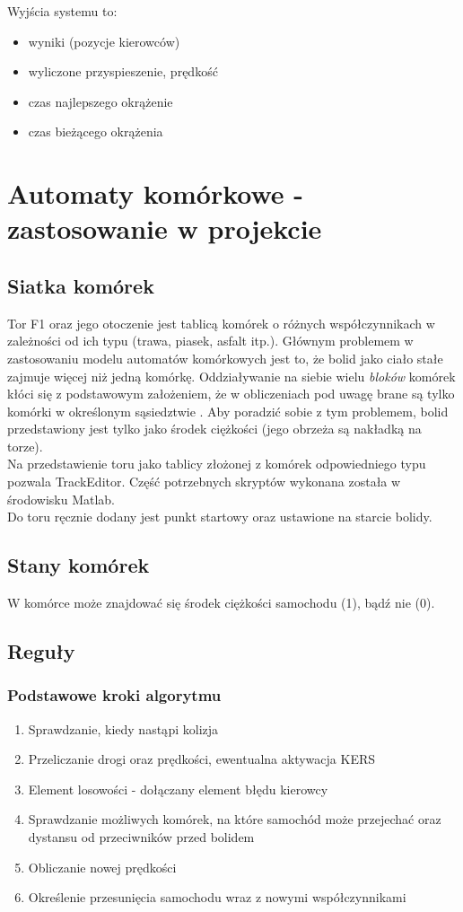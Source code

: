 \documentclass{article}
\begin{document}
Wyjścia systemu to:
\begin{itemize}
\item wyniki (pozycje kierowców)
\item wyliczone przyspieszenie, prędkość
\item czas najlepszego okrążenie
\item czas bieżącego okrążenia
\end{itemize}


\section{Automaty komórkowe - zastosowanie w projekcie}
\subsection{Siatka komórek}
Tor F1 oraz jego otoczenie jest tablicą komórek o różnych współczynnikach w zależności od ich typu (trawa, piasek, asfalt itp.). Głównym problemem w zastosowaniu modelu automatów komórkowych jest to, że bolid jako ciało stałe zajmuje więcej niż jedną komórkę. Oddziaływanie na siebie wielu \textit{bloków} komórek kłóci się z podstawowym założeniem, że w obliczeniach pod uwagę brane są tylko komórki w określonym sąsiedztwie \cite{particleSimulation}. Aby poradzić sobie z tym problemem, bolid przedstawiony jest tylko jako środek ciężkości (jego obrzeża są nakładką na torze). 	\\

Na przedstawienie toru jako tablicy złożonej z komórek odpowiedniego typu pozwala TrackEditor. Część potrzebnych  skryptów wykonana została w środowisku Matlab. \\

Do toru ręcznie dodany jest punkt startowy oraz ustawione na starcie bolidy.

\subsection{Stany komórek}
W komórce może znajdować się środek ciężkości samochodu (1), bądź nie (0).

\subsection{Reguły}
\subsubsection{Podstawowe kroki algorytmu}
\begin{enumerate}
\item Sprawdzanie, kiedy nastąpi kolizja
\item Przeliczanie drogi oraz prędkości, ewentualna aktywacja KERS
\item Element losowości - dołączany element błędu kierowcy
\item Sprawdzanie możliwych komórek, na które samochód może przejechać oraz dystansu od przeciwników przed bolidem
\item Obliczanie nowej prędkości
\item Określenie przesunięcia samochodu wraz z nowymi współczynnikami
\end{enumerate}
\end{document}
